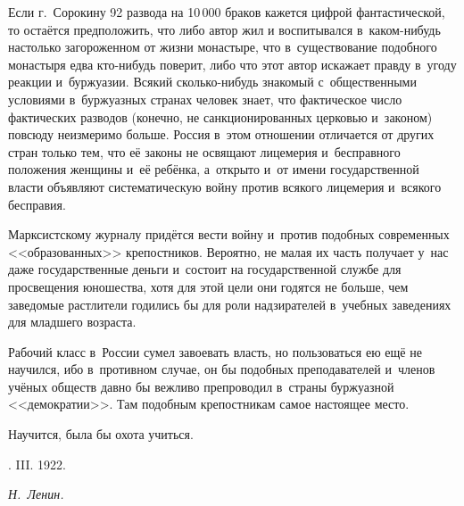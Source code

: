 Если г.~Сорокину 92 развода на 10\,000 браков кажется
цифрой фантастической, то остаётся предположить, что либо автор жил и
воспитывался в~каком-нибудь настолько загороженном от жизни монастыре, что
в~существование подобного монастыря едва кто-нибудь поверит, либо что этот
автор искажает правду в~угоду реакции и~буржуазии. Всякий сколько-нибудь
знакомый с~общественными условиями в~буржуазных странах человек знает, что
фактическое число фактических разводов (конечно, не санкционированных
церковью и~законом) повсюду неизмеримо больше. Россия в~этом отношении
отличается от других стран только тем, что её законы не освящают лицемерия
и~бесправного положения женщины и~её ребёнка, а~открыто и~от имени
государственной власти объявляют систематическую войну против всякого
лицемерия и~всякого бесправия.

Марксистскому журналу придётся вести войну и~против подобных современных
<<образованных>> крепостников. Вероятно, не малая их часть получает у~нас даже
государственные деньги и~состоит на государственной службе для просвещения
юношества, хотя для этой цели они годятся не больше, чем заведомые
растлители годились бы для роли надзирателей в~учебных заведениях для
младшего возраста.

Рабочий класс в~России сумел завоевать власть, но пользоваться ею ещё не
научился, ибо в~противном случае, он бы подобных преподавателей и~членов
учёных обществ давно бы вежливо препроводил в~страны буржуазной
<<демократии>>. Там подобным крепостникам самое настоящее место.

\nopagebreak
Научится, была бы охота учиться.

\nopagebreak \medskip
{}. III. 1922.
\nopagebreak \medskip

{\raggedleft \textit{Н.~Ленин.} \par}

\nopagebreak \medskip
\sectionline

\bigskip

